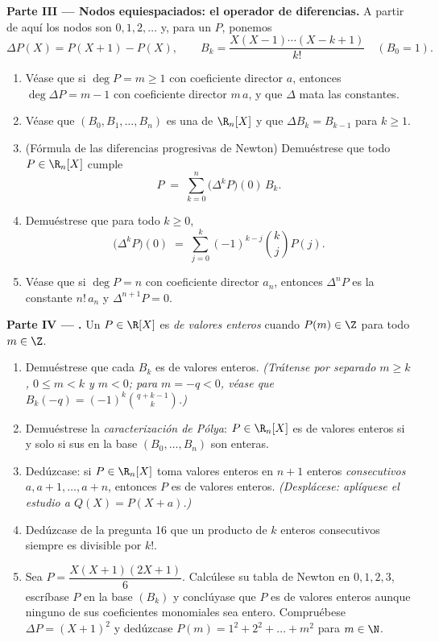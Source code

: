 \begin{problem}
\medskip
\noindent\textbf{Parte III --- Nodos equiespaciados: el operador de
diferencias.} A partir de aquí los nodos son $0, 1, 2, \dots$ y, para
un  $P$, ponemos
\[
\Delta P(X) = P(X + 1) - P(X),
\qquad
B_k = \frac{X(X-1)\cdots(X-k+1)}{k!} \quad (B_0 = 1).
\]
\begin{enumerate}[resume]
  \item Véase que si $\deg P = m \geq 1$ con coeficiente director
        $a$, entonces $\deg \Delta P = m - 1$ con coeficiente
        director $m\,a$, y que $\Delta$ mata las constantes.
  \item Véase que $(B_0, B_1, \dots, B_n)$ es una  de
        $\R_n[X]$ y que $\Delta B_k = B_{k-1}$ para $k \geq 1$.
  \item (Fórmula de las diferencias progresivas de Newton)
        Demuéstrese que todo $P \in \R_n[X]$ cumple
        \[
        P \;=\; \sum_{k=0}^{n} \bigl(\Delta^{k} P\bigr)(0)\, B_k .
        \]
  \item Demuéstrese que para todo $k \geq 0$,
        \[
        \bigl(\Delta^{k} P\bigr)(0) \;=\;
        \sum_{j=0}^{k} (-1)^{k-j} \binom{k}{j} P(j) .
        \]
  \item Véase que si $\deg P = n$ con coeficiente director $a_n$,
        entonces $\Delta^{n} P$ es la constante $n!\,a_n$ y
        $\Delta^{n+1} P = 0$.
\end{enumerate}

\medskip
\noindent\textbf{Parte IV --- .} Un
 $P \in \R[X]$ es \emph{de valores enteros} cuando
$P(m) \in \Z$ para todo $m \in \Z$.
\begin{enumerate}[resume]
  \item Demuéstrese que cada $B_k$ es de valores enteros.
        \emph{(Trátense por separado $m \geq k$, $0 \leq m < k$ y
        $m < 0$; para $m = -q < 0$, véase que
        $B_k(-q) = (-1)^k \binom{q + k - 1}{k}$.)}
  \item Demuéstrese la \emph{caracterización de Pólya}:
        $P \in \R_n[X]$ es de valores enteros si y solo si sus
         en la base $(B_0, \dots, B_n)$ son enteras.
  \item Dedúzcase: si $P \in \R_n[X]$ toma valores enteros en $n + 1$
        enteros \emph{consecutivos} $a, a+1, \dots, a+n$, entonces
        $P$ es de valores enteros. \emph{(Desplácese: aplíquese el
        estudio a $Q(X) = P(X + a)$.)}
  \item Dedúzcase de la pregunta 16 que un producto de $k$ enteros
        consecutivos siempre es divisible por $k!$.
  \item Sea $P = \dfrac{X(X+1)(2X+1)}{6}$. Calcúlese su tabla de
        Newton en $0, 1, 2, 3$, escríbase $P$ en la base $(B_k)$ y
        conclúyase que $P$ es de valores enteros aunque ninguno de
        sus coeficientes monomiales sea entero. Compruébese
        $\Delta P = (X+1)^2$ y dedúzcase
        $P(m) = 1^2 + 2^2 + \dots + m^2$ para $m \in \N$.
\end{enumerate}


\end{problem}
